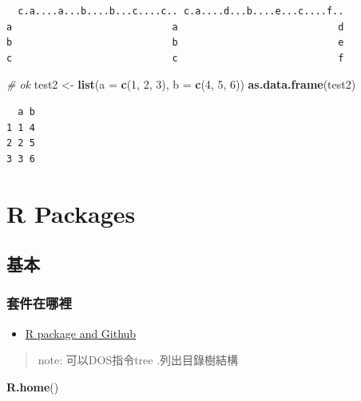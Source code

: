 \documentclass[]{book}
\newenvironment{Shaded}{\begin{snugshade}}{\end{snugshade}}
\newcommand{\CommentTok}[1]{\textcolor[rgb]{0.56,0.35,0.01}{\textit{#1}}}
\newcommand{\DataTypeTok}[1]{\textcolor[rgb]{0.13,0.29,0.53}{#1}}
\newcommand{\DecValTok}[1]{\textcolor[rgb]{0.00,0.00,0.81}{#1}}
\newcommand{\KeywordTok}[1]{\textcolor[rgb]{0.13,0.29,0.53}{\textbf{#1}}}
\newcommand{\NormalTok}[1]{#1}
\newcommand{\StringTok}[1]{\textcolor[rgb]{0.31,0.60,0.02}{#1}}
\providecommand{\tightlist}{%
  \setlength{\itemsep}{0pt}\setlength{\parskip}{0pt}}
\theoremstyle{definition}
\theoremstyle{definition}
\theoremstyle{definition}
\theoremstyle{remark}
\begin{document}
\begin{verbatim}
  c.a....a...b....b...c....c.. c.a....d...b....e...c....f..
a                            a                            d
b                            b                            e
c                            c                            f
\end{verbatim}

\begin{Shaded}
\begin{Highlighting}[]
\CommentTok{# ok}
\NormalTok{test2 <-}\StringTok{ }\KeywordTok{list}\NormalTok{(}\DataTypeTok{a =} \KeywordTok{c}\NormalTok{(}\DecValTok{1}\NormalTok{, }\DecValTok{2}\NormalTok{, }\DecValTok{3}\NormalTok{), }\DataTypeTok{b =} \KeywordTok{c}\NormalTok{(}\DecValTok{4}\NormalTok{, }\DecValTok{5}\NormalTok{, }\DecValTok{6}\NormalTok{))}
\KeywordTok{as.data.frame}\NormalTok{(test2)}
\end{Highlighting}
\end{Shaded}

\begin{verbatim}
  a b
1 1 4
2 2 5
3 3 6
\end{verbatim}

\hypertarget{r-packages}{%
\chapter{R Packages}\label{r-packages}}

\section{基本}

\subsection{套件在哪裡}

\begin{itemize}
\tightlist
\item
  \href{http://r-pkgs.had.co.nz/git.html}{R package and Github}
\end{itemize}

\begin{quote}
note: 可以DOS指令tree .列出目錄樹結構
\end{quote}

\begin{Shaded}
\begin{Highlighting}[]
\KeywordTok{R.home}\NormalTok{()}
\end{Highlighting}
\end{Shaded}
\end{document}
